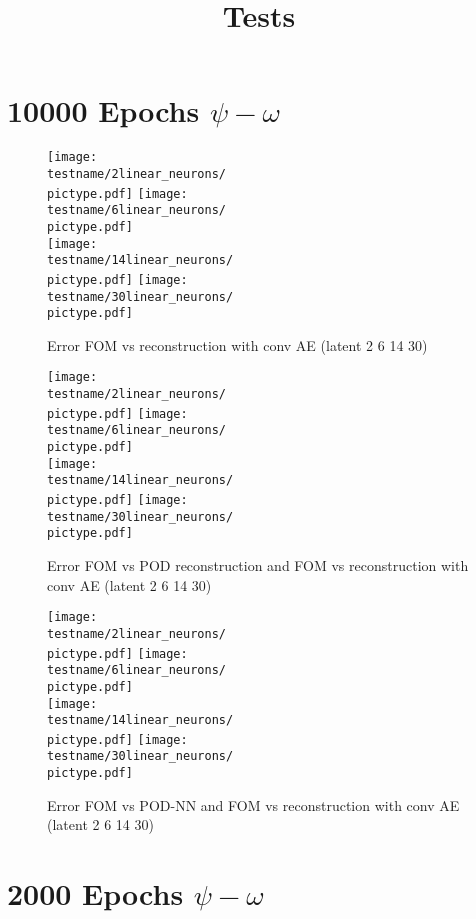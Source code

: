 \documentclass[USenglish]{article}
\newcommand{\1}{\begin{pmatrix}
		1\\
		1
\end{pmatrix}}
\begin{document}
	\title{Tests} 

\section{10000 Epochs $\psi-\omega$}
	
\newcommand{\testname}{../Stochastic_results/snapshots_tests/snapshots_6_conv/conv_AE_10000epochs}
 
\begin{figure}
	\newcommand{\pictype}{Error_convAE-FOM}
\texttt{[image: \\testname/2linear\_neurons/\\pictype.pdf]}
\texttt{[image: \\testname/6linear\_neurons/\\pictype.pdf]}\\
\texttt{[image: \\testname/14linear\_neurons/\\pictype.pdf]}
\texttt{[image: \\testname/30linear\_neurons/\\pictype.pdf]}
	\caption{Error FOM vs reconstruction with conv AE (latent 2 6 14 30)}
\end{figure}

\begin{figure}
	\newcommand{\pictype}{Error_POD-inv_transform}
	\texttt{[image: \\testname/2linear\_neurons/\\pictype.pdf]}
	\texttt{[image: \\testname/6linear\_neurons/\\pictype.pdf]}\\
	\texttt{[image: \\testname/14linear\_neurons/\\pictype.pdf]}
	\texttt{[image: \\testname/30linear\_neurons/\\pictype.pdf]}
	\caption{Error FOM vs POD reconstruction and FOM vs reconstruction with conv AE (latent 2 6 14 30)}
\end{figure}

\begin{figure}
	\newcommand{\pictype}{Error_POD_NN-inv_transform}
	\texttt{[image: \\testname/2linear\_neurons/\\pictype.pdf]}
	\texttt{[image: \\testname/6linear\_neurons/\\pictype.pdf]}\\
	\texttt{[image: \\testname/14linear\_neurons/\\pictype.pdf]}
	\texttt{[image: \\testname/30linear\_neurons/\\pictype.pdf]}
	\caption{Error FOM vs POD-NN and FOM vs reconstruction with conv AE (latent 2 6 14 30)}
\end{figure}

\newpage
\section{2000 Epochs $\psi-\omega$}
\renewcommand{\testname}{../Stochastic_results/snapshots_tests/snapshots_6_conv/conv_AE_2000epochs}
\end{document}
